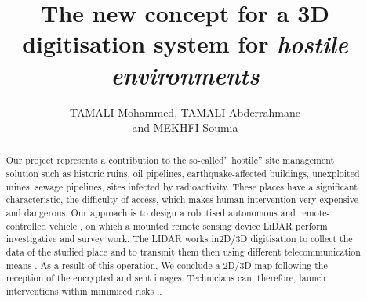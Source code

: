 \documentclass[Afour,sageh,times]{sagej}
\begin{document}

\title{The new concept for a 3D digitisation system for 
\itshape{hostile environments}}

\author{TAMALI Mohammed, TAMALI Abderrahmane\\ and MEKHFI Soumia}




\begin{abstract}
Our project represents a contribution to the so-called” hostile” site management solution such as historic ruins, oil pipelines, earthquake-affected buildings, unexploited mines, sewage pipelines, sites infected by radioactivity. These places have a significant characteristic, the difficulty of access, which makes human intervention very expensive and dangerous. Our approach is to design a robotised autonomous and remote-controlled \citep{Winkler2009} vehicle \citep{Rohmer2013},\citep{Silva2007} on which a mounted remote sensing device LiDAR perform investigative and survey work.  The  LIDAR  works  in2D/3D digitisation to collect the data of the studied place and to transmit them then using different telecommunication means \citep{Rubenstein2012}. As a result of this operation, We conclude a 2D/3D map following the reception of the encrypted and sent images.  Technicians can, therefore, launch interventions within minimised risks \citep{Sprawitz2014}.\citep{Bendjedid2016}.
\end{abstract}


\maketitle
\end{document}
